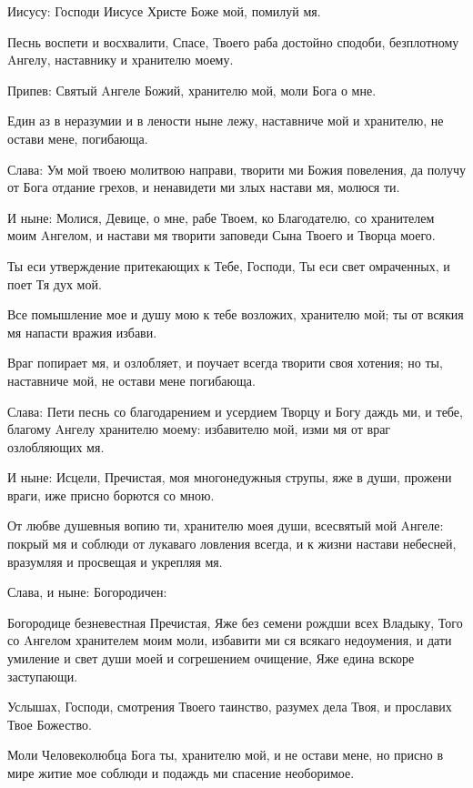   Иисусу: Господи Иисусе Христе Боже мой, помилуй мя.


  Песнь воспети и восхвалити, Спасе, Твоего раба достойно сподоби, безплотному Aнгелу, наставнику и хранителю моему.


  Припев: Святый Aнгеле Божий, хранителю мой, моли Бога о мне.


  Един аз в неразумии и в лености ныне лежу, наставниче мой и хранителю, не остави мене, погибающа.


  Слава: Ум мой твоею молитвою направи, творити ми Божия повеления, да получу от Бога отдание грехов, и ненавидети ми злых настави мя, молюся ти.


  И ныне: Молися, Девице, о мне, рабе Твоем, ко Благодателю, со хранителем моим Aнгелом, и настави мя творити заповеди Сына Твоего и Творца моего. 



  Ты еси утверждение притекающих к Тебе, Господи, Ты еси свет омраченных, и поет Тя дух мой.


  Все помышление мое и душу мою к тебе возложих, хранителю мой; ты от всякия мя напасти вражия избави.


  Враг попирает мя, и озлобляет, и поучает всегда творити своя хотения; но ты, наставниче мой, не остави мене погибающа.


  Слава: Пети песнь со благодарением и усердием Творцу и Богу даждь ми, и тебе, благому Aнгелу хранителю моему: избавителю мой, изми мя от враг озлобляющих мя.


  И ныне: Исцели, Пречистая, моя многонедужныя струпы, яже в души, прожени враги, иже присно борются со мною. 
  

\medskip


  От любве душевныя вопию ти, хранителю моея души, всесвятый мой Aнгеле: покрый мя и соблюди от лукаваго ловления всегда, и к жизни настави небесней, вразумляя и просвещая и укрепляя мя.


  Слава, и ныне: Богородичен:


  Богородице безневестная Пречистая, Яже без семени рождши всех Владыку, Того со Aнгелом хранителем моим моли, избавити ми ся всякаго недоумения, и дати умиление и свет души моей и согрешением очищение, Яже едина вскоре заступающи.
  

\medskip


  Услышах, Господи, смотрения Твоего таинство, разумех дела Твоя, и прославих Твое Божество.


  Моли Человеколюбца Бога ты, хранителю мой, и не остави мене, но присно в мире житие мое соблюди и подаждь ми спасение необоримое.


